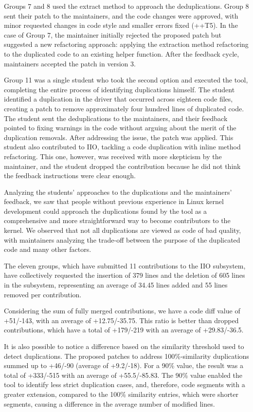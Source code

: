 \documentclass[sigconf]{acmart}
\begin{document}
Groups 7 and 8 used the extract method to approach the deduplications. Group 8 sent their patch to the maintainers, and the code changes were approved, with minor requested changes in code style and smaller errors fixed (++T5). In the case of Group 7, the maintainer initially rejected the proposed patch but suggested a new refactoring approach: applying the extraction method refactoring to the duplicated code to an existing helper function. After the feedback cycle, maintainers accepted the patch in version 3.


Group 11 was a single student who took the second option and executed the tool, completing the entire process of identifying duplications himself. The student identified a duplication in the driver that occurred across eighteen code files, creating a patch to remove approximately four hundred lines of duplicated code. The student sent the deduplications to the maintainers, and their feedback pointed to fixing warnings in the code without arguing about the merit of the duplication removals. After addressing the issue, the patch was applied. This student also contributed to IIO, tackling a code duplication with inline method refactoring. This one, however, was received with more skepticism by the maintainer, and the student dropped the contribution because he did not think the feedback instructions were clear enough.

Analyzing the students' approaches to the duplications and the maintainers' feedback, we saw that people without previous experience in Linux kernel development could approach the duplications found by the tool as a comprehensive and more straightforward way to become contributors to the kernel. We observed that not all duplications are viewed as code of bad quality, with maintainers analyzing the trade-off between the purpose of the duplicated code and many other factors.

The eleven groups, which have submitted 11 contributions to the IIO subsystem, have collectively requested the insertion of 379 lines and the deletion of 605 lines in the subsystem, representing an average of 34.45 lines added and 55 lines removed per contribution.

Considering the sum of fully merged contributions, we have a code diff value of +51/-143, with an average of +12.75/-35.75. This ratio is better than dropped contributions, which have a total of +179/-219 with an average of +29.83/-36.5.

It is also possible to notice a difference based on the similarity threshold used to detect duplications. The proposed patches to address 100\%-similarity duplications summed up to +46/-90 (average of +9.2/-18). For a 90\% value, the result was a total of +333/-515 with an average of +55.5/-85.83. The 90\% value enabled the tool to identify less strict duplication cases, and, therefore, code segments with a greater extension, compared to the 100\% similarity entries, which were shorter segments, causing a difference in the average number of modified lines.
\end{document}
